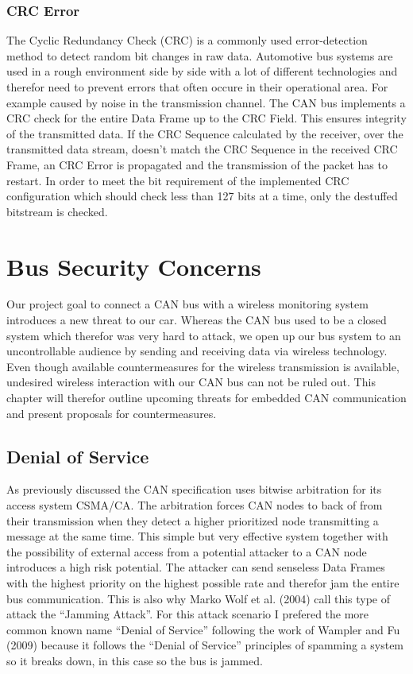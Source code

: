 	\subsubsection{CRC Error}
	\label{subsec:crc_check}
	The Cyclic Redundancy Check (CRC) is a commonly used error-detection method to
	detect random bit changes in raw data. Automotive bus systems are used in a
	rough environment side by side with a lot of different technologies and
	therefor need to prevent errors that often occure in their operational area.
	For example caused by noise in the transmission channel. The CAN bus implements
	a CRC check for the entire Data Frame up to the CRC Field. This ensures
	integrity of the transmitted data. If the CRC Sequence calculated by the
	receiver, over the transmitted data stream, doesn't match the CRC Sequence in
	the received CRC Frame, an CRC Error is propagated and the transmission of the
	packet has to restart. In order to meet the bit requirement of the implemented
	CRC configuration which should check less than 127 bits at a time, only the
	destuffed bitstream is checked.

\section{Bus Security Concerns} 
Our project goal to connect a CAN bus with a wireless monitoring system
introduces a new threat to our car. Whereas the CAN bus used to be a closed
system which therefor was very hard to attack, we open up our bus
system to an uncontrollable audience by sending and receiving data via wireless
technology. Even though available countermeasures for the wireless
transmission is available, undesired wireless interaction with our CAN bus can
not be ruled out. This chapter will therefor outline upcoming threats for embedded CAN
communication and present proposals for countermeasures.

\subsection{Denial of Service}
As previously discussed the CAN specification uses bitwise arbitration for its
access system CSMA/CA. The arbitration forces CAN nodes to back of from their
transmission when they detect a higher prioritized node transmitting a message
at the same time. This simple but very effective system together with the
possibility of external access from a potential attacker to a CAN node
introduces a high risk potential. The attacker can send senseless Data Frames
with the highest priority on the highest possible rate and therefor jam the
entire bus communication. This is also why Marko Wolf et al. (2004) call this
type of attack the ``Jamming Attack''. For this attack scenario I prefered the
more common known name ``Denial of Service'' following the work of Wampler and
Fu (2009) \cite{security-wampler-huirong} because it follows
the ``Denial of Service'' principles of spamming a system so it breaks down,
in this case so the bus is jammed.

